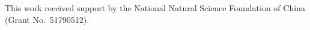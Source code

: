 \documentclass[journal,final]{new-aiaa}
\begin{document}
%
%
%
%
This work received support by the National Natural
Science Foundation of China (Grant No.~51790512).



\end{document}
